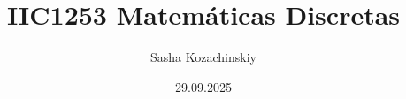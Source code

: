 \documentclass{beamer}
\title{IIC1253 Matemáticas Discretas}
\author{Sasha Kozachinskiy}
\institute{DCC UC}
\date{29.09.2025}
\begin{document}
\begin{frame}
\end{frame}

\begin{frame}
\end{frame}

\begin{frame}
\end{frame}

\begin{frame}
\end{frame}

\begin{frame}
\end{frame}

\begin{frame}
\end{frame}

\begin{frame}
\end{frame}

\begin{frame}
\end{frame}

\begin{frame}
\end{frame}

\begin{frame}
\end{frame}

\begin{frame}
\end{frame}

\begin{frame}
\end{frame}

\begin{frame}
\end{frame}

\begin{frame}
\end{frame}

\begin{frame}
\end{frame}

\begin{frame}
\end{frame}

\begin{frame}
\end{frame}

\begin{frame}
\end{frame}
\end{document}
